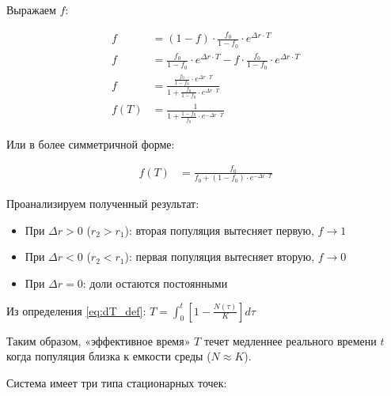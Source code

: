 \documentclass[a4paper, 14pt]{extarticle}
\begin{document}
Выражаем $f$:

\begin{align}
    f &= (1-f) \cdot \frac{f_0}{1-f_0} \cdot e^{\Delta r \cdot T} \nonumber \\
    f &= \frac{f_0}{1-f_0} \cdot e^{\Delta r \cdot T} - f \cdot \frac{f_0}{1-f_0} \cdot e^{\Delta r \cdot T} \nonumber \\
    f &= \frac{\frac{f_0}{1-f_0} \cdot e^{\Delta r \cdot T}}{1 + \frac{f_0}{1-f_0} \cdot e^{\Delta r \cdot T}} \nonumber \\
    f(T) &= \frac{1}{1 + \frac{1-f_0}{f_0} \cdot e^{-\Delta r \cdot T}} \label{eq:f_T_form1}
\end{align}

Или в более симметричной форме:

\begin{align}
    f(T) &= \frac{f_0}{f_0 + (1-f_0) \cdot e^{-\Delta r \cdot T}} \label{eq:f_T_form2}
\end{align}

Проанализируем полученный результат:

\begin{itemize}
    \item При $\Delta r > 0$ ($r_2 > r_1$): вторая популяция вытесняет первую, $f \to 1$
    \item При $\Delta r < 0$ ($r_2 < r_1$): первая популяция вытесняет вторую, $f \to 0$  
    \item При $\Delta r = 0$: доли остаются постоянными
\end{itemize}

Из определения \eqref{eq:dT_def}: $T = \int_0^t \left[1 - \frac{N(\tau)}{K}\right] d\tau$

Таким образом, «эффективное время» $T$ течет медленнее реального времени $t$ когда популяция близка к емкости среды ($N \approx K$).

Система имеет три типа стационарных точек:
\end{document}
